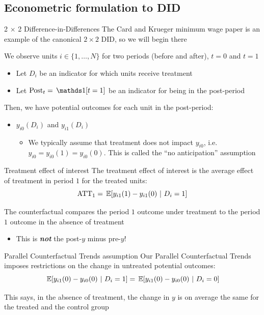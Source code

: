 \documentclass[aspectratio=169,t,11pt,table]{beamer}
\begin{document}
\subsection{Econometric formulation to DID}

\begin{frame}{2 $\times$ 2 Difference-in-Differences}
  The Card and Krueger minimum wage paper is an example of the canonical $2 \times 2$ DID, so we will begin there
  
  \bigskip
  We observe units $i \in \{ 1, \dots, N \}$ for two periods (before and after), $t = 0$ and $t = 1$
  \begin{itemize}
    \item Let $D_i$ be an indicator for which units receive treatment
    \item Let $\text{Post}_t = \one{t = 1}$ be an indicator for being in the post-period
  \end{itemize}


  \pause
  \bigskip
  Then, we have potential outcomes for each unit in the post-period:
  \begin{itemize}
    \item $y_{i0}(D_i)$ and $y_{i1}(D_i)$
    \begin{itemize}
      \item We typically assume that treatment does not impact $y_{i0}$, i.e. $y_{i0} = y_{i0}(1) = y_{i0}(0)$. This is called the ``no anticipation'' assumption
    \end{itemize}
  \end{itemize}  
\end{frame}

\begin{frame}{Treatment effect of interest}
  The treatment effect of interest is the average effect of treatment in period $1$ for the treated units:
  $$
    \text{ATT}_1 = \expec{y_{i1}(1) - y_{i1}(0)}{D_i = 1}
  $$
  
  The counterfactual compares the period $1$ outcome under treatment to the period $1$ outcome in the absence of treatment
  \begin{itemize}
    \item {\color{red} This is \emph{\textbf{not}} the post-$y$ minus pre-$y$!}
  \end{itemize}
\end{frame}

\begin{frame}{Parallel Counterfactual Trends assumption}
  Our \alert{Parallel Counterfactual Trends} imposes restrictions on the change in untreated potential outcomes:
  $$
    \expec{y_{i1}(0) - y_{i0}(0)}{D_i = 1} = \expec{y_{i1}(0) - y_{i0}(0)}{D_i = 0} 
  $$

  \bigskip
  This says, in the absence of treatment, the change in $y$ is on average the same for the treated and the control group
\end{frame}
\end{document}
